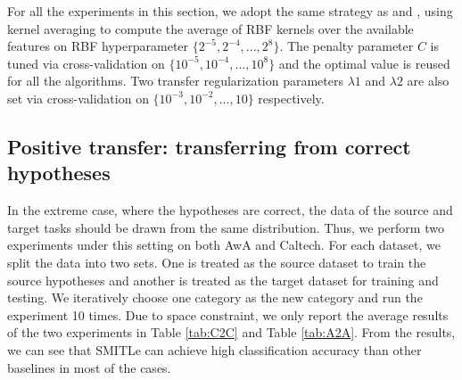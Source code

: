 



For all the experiments in this section, we adopt the same strategy as \cite{kuzborskij2013n} and \cite{tommasi2014learning}, using kernel averaging \cite{gehler2009feature} to compute the average of RBF kernels over the available features on RBF hyperparameter $\{2^{-5},2^{-4},...,2^8\}$. The penalty parameter $C$ is tuned via cross-validation on $\{10^{-5},10^{-4},...,10^8\}$ and the optimal value is reused for all the algorithms.
Two transfer regularization parameters $\lambda1$ and $\lambda2$ are also set via cross-validation on $\{10^{-3},10^{-2},...,10\}$ respectively.

\subsection{Positive transfer: transferring from correct hypotheses}
In the extreme case, where the hypotheses are correct, the data of the source and target tasks should be drawn from the same distribution. Thus, we perform two experiments under this setting on both AwA and Caltech. For each dataset, we split the data into two sets. One is treated as the source dataset to train the source hypotheses and another is treated as the target dataset for training and testing. We iteratively choose one category as the new category and run the experiment 10 times. Due to space constraint, we only report the average results of the two experiments in Table \ref{tab:C2C} and Table \ref{tab:A2A}. From the results, we can see that SMITLe can achieve high classification accuracy than other baselines in most of the cases.

